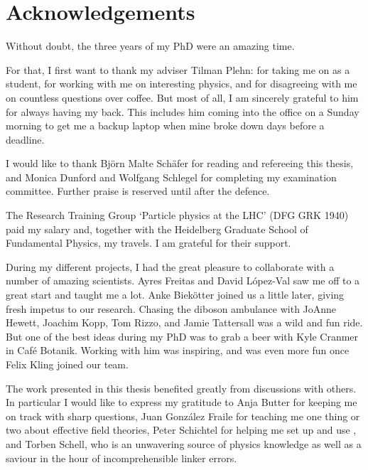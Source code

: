 
\chapter*{Acknowledgements}

Without doubt, the three years of my PhD were an amazing time. 

For that, I first want to thank my adviser Tilman Plehn: for taking me
on as a student, for working with me on interesting physics, and for
disagreeing with me on countless questions over coffee. But most of
all, I am sincerely grateful to him for always having my back. This
includes him coming into the office on a Sunday morning to get me a
backup laptop when mine broke down days before a deadline.
%
%
%

I would like to thank Bj\"orn Malte Sch\"afer for reading and
refereeing this thesis, and Monica Dunford and Wolfgang Schlegel for
completing my examination committee. Further praise is reserved until
after the defence.

The Research Training Group `Particle physics at the LHC' (DFG GRK
1940) paid my salary and, together with the Heidelberg Graduate School
of Fundamental Physics, my travels. I am grateful for their support.

During my different projects, I had the great pleasure to
collaborate with a number of amazing scientists. Ayres Freitas and
David L\'opez-Val saw me off to a great start and taught me a
lot. Anke Biek\"otter joined us a little later, giving fresh impetus
to our research. Chasing the diboson ambulance with JoAnne Hewett,
Joachim Kopp, Tom Rizzo, and Jamie Tattersall was a wild and fun
ride. But one of the best ideas during my PhD was to grab a beer with
Kyle Cranmer in Caf\'e Botanik. Working with him was inspiring, and
was even more fun once Felix Kling joined our team.

The work presented in this thesis benefited greatly from discussions
with others. In particular I would like to express my gratitude to
Anja Butter for keeping me on track with sharp questions, Juan
Gonz\'alez Fraile for teaching me one thing or two about effective field
theories, Peter Schichtel for helping me set up and use
, and Torben Schell, who is an unwavering source of
physics knowledge as well as a saviour in the hour of incomprehensible
linker errors.

